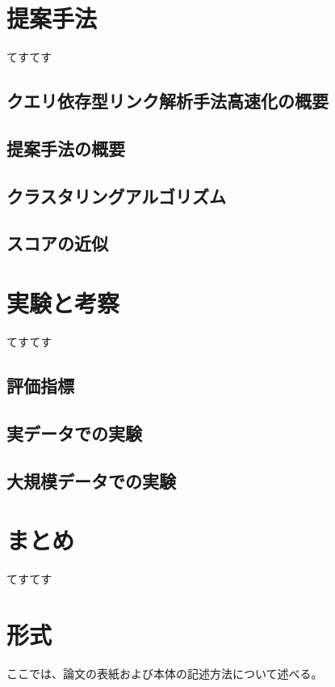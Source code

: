 \documentclass[a4paper,11pt]{jreport}
\begin{document}
\chapter{提案手法}

てすてす

\section{クエリ依存型リンク解析手法高速化の概要}
\section{提案手法の概要}
\section{クラスタリングアルゴリズム}
\section{スコアの近似}

\chapter{実験と考察}

てすてす

\section{評価指標}
\section{実データでの実験}
\section{大規模データでの実験}

\chapter{まとめ}

てすてす

\chapter{形式}

ここでは、論文の表紙および本体の記述方法について述べる。
\end{document}
